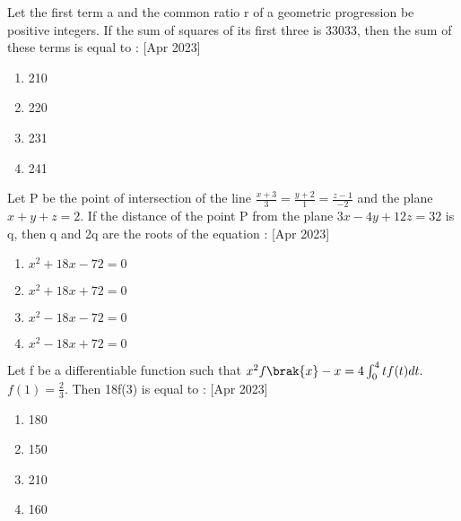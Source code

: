     \item Let the first term a and the common ratio r of a geometric progression be positive integers. If the sum of squares of its first three is 33033, then the sum of these terms is equal to :
     \hfill{[Apr 2023]}
    \begin{multicols}{4}
            \begin{enumerate}
              \item 210
              \item 220
              \item 231
              \item 241
            \end{enumerate}
        \end{multicols}



    \item Let P  be the point of intersection of the line $\frac{x+3}{3}=\frac{y+2}{1}=\frac{z-1}{-2}$ and the plane  $x+y+z=2$. If the distance of the point P from the plane $3x-4y+12z=32$ is q, then q and 2q are the roots of the equation :
     \hfill{[Apr 2023]}
    \begin{multicols}{4}
            \begin{enumerate}
              \item $x^2+18x-72=0$
              \item $x^2+18x+72=0$
              \item $x^2-18x-72=0$
              \item $x^2-18x+72=0$
            \end{enumerate}
        \end{multicols}
    \item Let f be a differentiable function such that $x^2f\brak{x}-x=4\int_{0}^{4} tf(t)dt.$ $f(1)=\frac{2}{3}$. Then 18f(3) is  equal to :
     \hfill{[Apr 2023]}
    \begin{multicols}{4}
            \begin{enumerate}
              \item 180
              \item 150
              \item 210
              \item 160
            \end{enumerate}
        \end{multicols}

